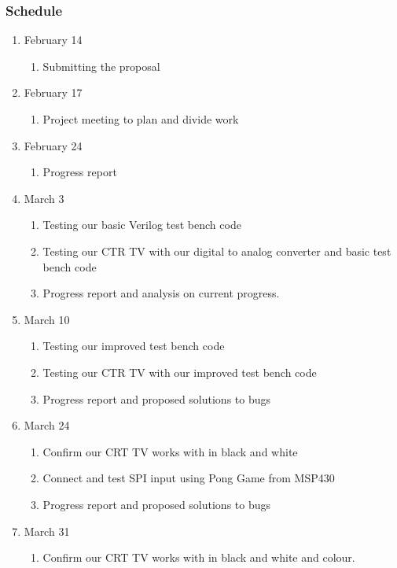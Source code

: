 \subsubsection*{Schedule}

\begin{enumerate}
	\item February 14
	\begin{enumerate}
		\item Submitting the proposal
	\end{enumerate}
	\item February 17
	\begin{enumerate}
		\item Project meeting to plan and divide work 
	\end{enumerate}
	\item February 24
	\begin{enumerate}
		\item Progress report
	\end{enumerate}
	\item March 3
	\begin{enumerate}
		\item Testing our basic Verilog test bench code
		\item Testing our CTR TV with our digital to analog converter and basic test bench code
		\item Progress report and analysis on current progress.
	\end{enumerate}
	\item March 10
	\begin{enumerate}
		\item Testing our improved test bench code
		\item Testing our CTR TV with our improved test bench code
		\item Progress report and proposed solutions to bugs
	\end{enumerate}
	\item March 24
	\begin{enumerate}
		\item Confirm our CRT TV works with in black and white
		\item Connect and test SPI input using Pong Game from MSP430
		\item Progress report and proposed solutions to bugs
	\end{enumerate}
	\item March 31
	\begin{enumerate}
		\item Confirm our CRT TV works with in black and white and colour.

\end{enumerate}
\end{enumerate}
